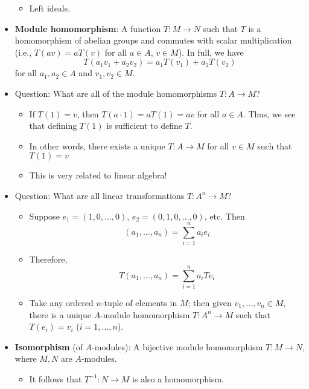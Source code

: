 \documentclass[../notes.tex]{subfiles}
\begin{document}
\begin{itemize}
    \begin{itemize}
        \item Left ideals.
    \end{itemize}
    \item \textbf{Module homomorphism}: A function $T:M\to N$ such that $T$ is a homomorphism of abelian groups and commutes with scalar multiplication (i.e., $T(av)=aT(v)$ for all $a\in A$, $v\in M$). In full, we have
    \begin{equation*}
        T(a_1v_1+a_2v_2) = a_1T(v_1)+a_2T(v_2)
    \end{equation*}
    for all $a_1,a_2\in A$ and $v_1,v_2\in M$.
    \item Question: What are all of the module homomorphisms $T:A\to M$?
    \begin{itemize}
        \item If $T(1)=v$, then $T(a\cdot 1)=aT(1)=av$ for all $a\in A$. Thus, we see that defining $T(1)$ is sufficient to define $T$.
        \item In other words, there exists a unique $T:A\to M$ for all $v\in M$ such that $T(1)=v$
        \item This is very related to linear algebra!
    \end{itemize}
    \item Question: What are all linear transformations $T:A^n\to M$?
    \begin{itemize}
        \item Suppose $e_1=(1,0,\dots,0)$, $e_2=(0,1,0,\dots,0)$, etc. Then
        \begin{equation*}
            (a_1,\dots,a_n) = \sum_{i=1}^na_ie_i
        \end{equation*}
        \item Therefore,
        \begin{equation*}
            T(a_1,\dots,a_n) = \sum_{i=1}^na_iTe_i
        \end{equation*}
        \item Take any ordered $n$-tuple of elements in $M$; then given $v_1,\dots,v_n\in M$, there is a unique $A$-module homomorphism $T:A^n\to M$ such that $T(e_i)=v_i$ ($i=1,\dots,n$).
    \end{itemize}
    \item \textbf{Isomorphism} (of $A$-modules): A bijective module homomorphism $T:M\to N$, where $M,N$ are $A$-modules.
    \begin{itemize}
        \item It follows that $T^{-1}:N\to M$ is also a homomorphism.

\end{itemize}
\end{itemize}
\end{document}
